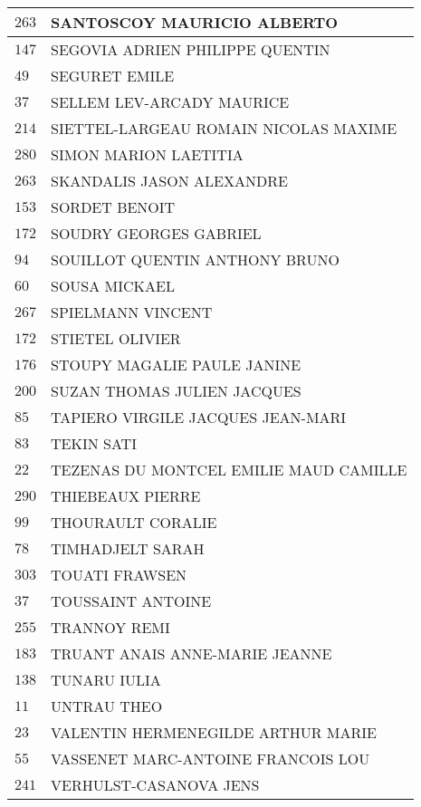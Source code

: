 \begin{xltabular}{\linewidth}{|l|X|}
    \hline
    $263$ & SANTOSCOY MAURICIO ALBERTO \\
    \hline
    $147$ & SEGOVIA ADRIEN PHILIPPE QUENTIN \\
    \hline
    $49$ & SEGURET EMILE \\
    \hline
    $37$ & SELLEM LEV-ARCADY MAURICE \\
    \hline
    $214$ & SIETTEL-LARGEAU ROMAIN NICOLAS MAXIME \\
    \hline
    $280$ & SIMON MARION LAETITIA \\
    \hline
    $263$ & SKANDALIS JASON ALEXANDRE \\
    \hline
    $153$ & SORDET BENOIT \\
    \hline
    $172$ & SOUDRY GEORGES GABRIEL \\
    \hline
    $94$ & SOUILLOT QUENTIN ANTHONY BRUNO \\
    \hline
    $60$ & SOUSA MICKAEL \\
    \hline
    $267$ & SPIELMANN VINCENT \\
    \hline
    $172$ & STIETEL OLIVIER \\
    \hline
    $176$ & STOUPY MAGALIE PAULE JANINE \\
    \hline
    $200$ & SUZAN THOMAS JULIEN JACQUES \\
    \hline
    $85$ & TAPIERO VIRGILE JACQUES JEAN-MARI \\
    \hline
    $83$ & TEKIN SATI \\
    \hline
    $22$ & TEZENAS DU MONTCEL EMILIE MAUD CAMILLE \\
    \hline
    $290$ & THIEBEAUX PIERRE \\
    \hline
    $99$ & THOURAULT CORALIE \\
    \hline
    $78$ & TIMHADJELT SARAH \\
    \hline
    $303$ & TOUATI FRAWSEN \\
    \hline
    $37$ & TOUSSAINT ANTOINE \\
    \hline
    $255$ & TRANNOY REMI \\
    \hline
    $183$ & TRUANT ANAIS ANNE-MARIE JEANNE \\
    \hline
    $138$ & TUNARU IULIA \\
    \hline
    $11$ & UNTRAU THEO \\
    \hline
    $23$ & VALENTIN HERMENEGILDE ARTHUR MARIE \\
    \hline
    $55$ & VASSENET MARC-ANTOINE FRANCOIS LOU \\
    \hline
    $241$ & VERHULST-CASANOVA JENS \\

\end{xltabular}
